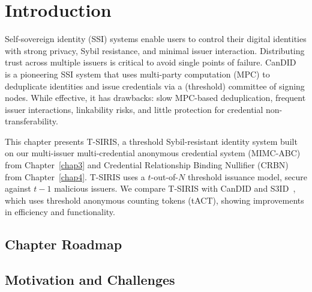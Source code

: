 \label{chap6}

\section{Introduction}\label{sec:threshold-intro}
Self-sovereign identity (SSI) systems enable users to control their digital identities with strong privacy, Sybil resistance, and minimal issuer interaction. Distributing trust across multiple issuers is critical to avoid single points of failure. CanDID~\cite{maram2021candid} is a pioneering SSI system that uses multi-party computation (MPC) to deduplicate identities and issue credentials via a (threshold) committee of signing nodes. While effective, it has drawbacks: slow MPC-based deduplication, frequent issuer interactions, linkability risks, and little protection for credential non-transferability.

This chapter presents T-SIRIS, a threshold Sybil-resistant identity system built on our multi-issuer multi-credential anonymous credential system (MIMC-ABC) from Chapter~\ref{chap3} and Credential Relationship Binding Nullifier (CRBN) from Chapter~\ref{chap4}. T-SIRIS uses a $t$-out-of-$N$ threshold issuance model, secure against $t-1$ malicious issuers. We compare T-SIRIS with CanDID and S3ID~\cite{rabaninejad_attribute-based_2024}, which uses threshold anonymous counting tokens (tACT), showing improvements in efficiency and functionality.

\subsection*{Chapter Roadmap}

\subsection{Motivation and Challenges}

